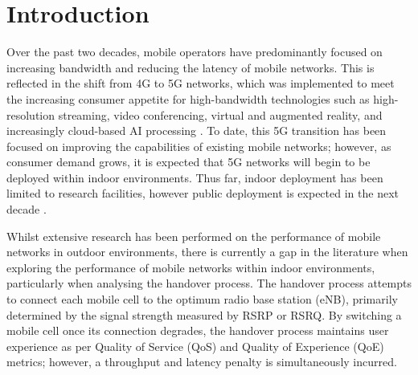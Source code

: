 \chapter{Introduction}

Over the past two decades, mobile operators have predominantly focused on increasing bandwidth and reducing the latency of mobile networks. This is reflected in the shift from 4G to 5G networks, which was implemented to meet the increasing consumer appetite for high-bandwidth technologies such as high-resolution streaming, video conferencing, virtual and augmented reality, and increasingly cloud-based AI processing \cite{cisco_cisco_2023}. To date, this 5G transition has been focused on improving the capabilities of existing mobile networks; however, as consumer demand grows, it is expected that 5G networks will begin to be deployed within indoor environments. Thus far, indoor deployment has been limited to research facilities, however public deployment is expected in the next decade \cite{zander_beyond_2016}. 

Whilst extensive research has been performed on the performance of mobile networks in outdoor environments, there is currently a gap in the literature when exploring the performance of mobile networks within indoor environments, particularly when analysing the handover process. The handover process attempts to connect each mobile cell to the optimum radio base station (eNB), primarily determined by the signal strength measured by RSRP or RSRQ. By switching a mobile cell once its connection degrades, the handover process maintains user experience as per Quality of Service (QoS) and Quality of Experience (QoE) metrics; however, a throughput and latency penalty is simultaneously incurred.  
% 

